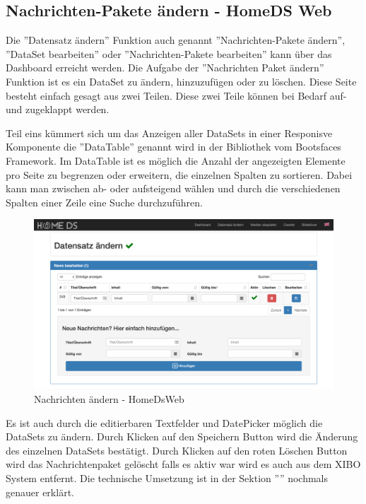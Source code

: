 \subsection{Nachrichten-Pakete ändern - HomeDS Web}\label{sec:homedswebdataset}
Die ''Datensatz ändern'' Funktion auch genannt ''Nachrichten-Pakete ändern'', ''DataSet bearbeiten'' oder ''Nachrichten-Pakete bearbeiten'' kann über das Dashboard erreicht werden.
Die Aufgabe der ''Nachrichten Paket ändern'' Funktion ist es ein DataSet zu ändern, hinzuzufügen oder zu löschen. Diese Seite besteht einfach gesagt aus zwei Teilen. Diese zwei Teile können bei Bedarf auf- und zugeklappt werden.

Teil eins kümmert sich um das Anzeigen aller DataSets in einer Responisve Komponente die ''DataTable'' genannt wird in der Bibliothek vom Bootsfaces Framework. Im DataTable ist es möglich die Anzahl der angezeigten Elemente pro Seite zu begrenzen oder erweitern, die einzelnen Spalten zu sortieren. Dabei kann man zwischen ab- oder aufsteigend wählen und durch die verschiedenen Spalten einer Zeile eine Suche durchzuführen. 

\begin{figure}[H]
\centering
\includegraphics[width=1\textwidth]{images/08_HomeDsWeb/NachrichtenPaket.png}
\caption{Nachrichten ändern - HomeDsWeb}
\label{img:changenews}
\end{figure}


Es ist auch durch die editierbaren Textfelder und DatePicker möglich die DataSets zu ändern. Durch Klicken auf den Speichern Button wird die Änderung des einzelnen DataSets bestätigt. Durch Klicken auf den roten Löschen Button wird das Nachrichtenpaket gelöscht falls es aktiv war wird es auch aus dem XIBO System entfernt. Die technische Umsetzung ist in der Sektion '''' nochmals genauer erklärt. 

